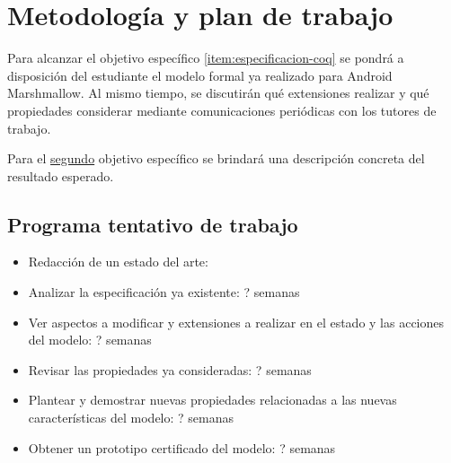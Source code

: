 \section{Metodología y plan de trabajo}

Para alcanzar el objetivo específico \ref{item:especificacion-coq} se pondrá a
disposición del estudiante el modelo formal ya realizado para Android
Marshmallow. Al mismo tiempo, se discutirán qué extensiones realizar y qué
propiedades considerar mediante comunicaciones periódicas con los tutores de
trabajo.

Para el \hyperref[item:prototipo]{segundo} objetivo específico se brindará una
descripción concreta del resultado esperado.

\subsection{Programa tentativo de trabajo}
\begin{itemize}
    \item Redacción de un estado del arte:
    \item Analizar la especificación ya existente: ? semanas
    \item Ver aspectos a modificar y extensiones a realizar en el estado y las
          acciones del modelo: ? semanas
    \item Revisar las propiedades ya consideradas: ? semanas
    \item Plantear y demostrar nuevas propiedades relacionadas a las nuevas
          características del modelo: ? semanas
    \item Obtener un prototipo certificado del modelo: ? semanas
\end{itemize}
